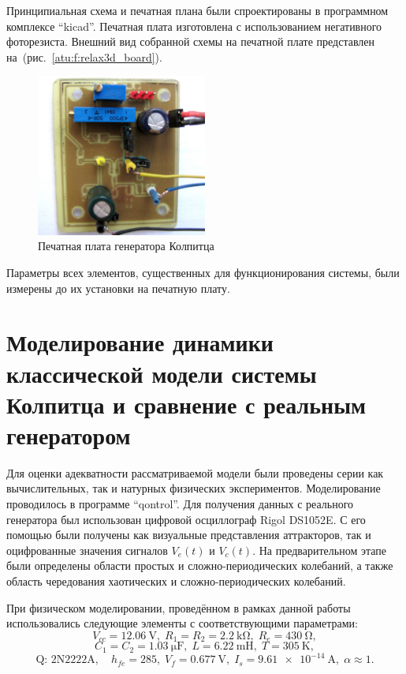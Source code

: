 Принципиальная схема и печатная плана были спроектированы в
программном комплексе ``kicad''. %
Печатная плата изготовлена с использованием негативного фоторезиста.
Внешний вид собранной схемы на печатной плате представлен на~(рис.~\ref{atu:f:relax3d_board}).

\begin{figure}[htb!]
\centerline{\includegraphics[width=0.5\textwidth]{p/colp_board.jpg} }
\caption{Печатная плата генератора Колпитца}
\label{atu:f:colp_board}
\end{figure}

Параметры всех элементов, существенных для функционирования системы,
были измерены до их установки на печатную плату.


\section{Моделирование динамики классической модели системы Колпитца и сравнение с реальным генератором}  %

Для оценки адекватности рассматриваемой модели были проведены серии как
вычислительных, так и натурных физических экспериментов.
Моделирование проводилось в программе ``qontrol''.
Для получения данных с реального генератора был использован цифровой осциллограф
Rigol DS1052E. %
С его помощью были получены как визуальные представления
аттракторов, так и оцифрованные значения сигналов $V_e(t)$ и $V_c(t)$.
На предварительном этапе были определены области простых и сложно-периодических колебаний,
а также область чередования хаотических и сложно-периодических колебаний.

При физическом моделировании, проведённом в рамках данной работы использовались следующие
элементы с соответствующими параметрами:
%
\[
  V_{cc} = \SI{12.06}{\volt},          \;
  R_1 = R_2 = \SI{2.2}{\kilo\ohm},     \;
  R_e = \SI{430}{\ohm},
\]
%
\[
  C_1 = C_2 = \SI{1.03}{\micro\farad}, \;
  L = \SI{6.22}{\milli\henry},         \;
  T = \SI{305}{\kelvin},
\]
%
\[
  \text{Q: 2N2222A}, \quad
  h_{fe}=285, \;
  V_f = \SI{0.677}{\volt}, \;
  I_s = \SI{9.61e-14}{\ampere}, \;
  \alpha \approx 1.
\]


